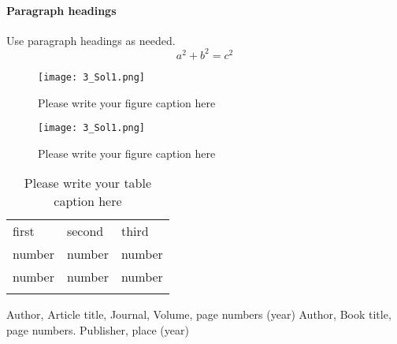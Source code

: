 \paragraph{Paragraph headings} Use paragraph headings as needed.
\begin{equation}
a^2+b^2=c^2
\end{equation}

\begin{figure}
  \texttt{[image: 3\_Sol1.png]}
\caption{Please write your figure caption here}
\label{fig:1}       %
\end{figure}
%
\begin{figure*}
  \texttt{[image: 3\_Sol1.png]}
\caption{Please write your figure caption here}
\label{fig:2}       %
\end{figure*}
%
\begin{table}
\caption{Please write your table caption here}
\label{tab:1}       %
\begin{tabular}{lll}
\hline\noalign{\smallskip}
first & second & third  \\
\noalign{\smallskip}\hline\noalign{\smallskip}
number & number & number \\
number & number & number \\
\noalign{\smallskip}\hline
\end{tabular}
\end{table}




\begin{thebibliography}{}
%
%
Author, Article title, Journal, Volume, page numbers (year)
Author, Book title, page numbers. Publisher, place (year)
\end{thebibliography}



